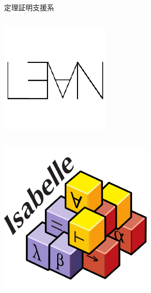 \documentclass[17pt,aspectratio=169]{beamer}
\begin{document}
\begin{frame}{定理証明支援系}
\begin{columns}
\begin{column}{0.35\textwidth}
\begin{columns}
\begin{column}{0.4\textwidth}
                    \includegraphics[width=1\linewidth]{./images/lean.png}
                \end{column}
            \end{columns}
            \vspace{-10pt}
            \begin{columns}
                \begin{column}{0.4\textwidth}
                    \includegraphics[width=1\linewidth]{./images/isabelle_logo.png}

\end{column}
\end{columns}
\end{column}
\end{columns}
\end{frame}
\end{document}

